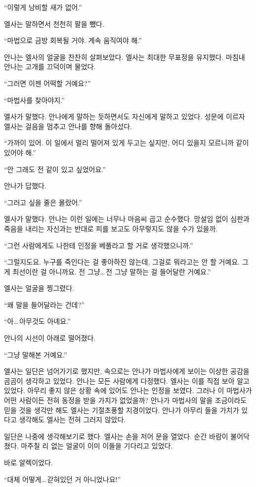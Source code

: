 ``이렇게 낭비할 새가 없어.''

엘사는 말하면서 천천히 팔을 뺐다.

``마법으로 금방 회복될 거야. 계속 움직여야 해.''

안나는 엘사의 얼굴을 찬찬히 살펴보았다. 엘사는 최대한 무표정을 유지했다. 마침내 안나는 고개를 끄덕이며 물었다.

``그러면 이젠 어떡할 거예요?''

``마법사를 찾아야지.''

엘사가 말했다. 안나에게 말하는 듯하면서도 자신에게 말하고 있었다. 성문에 이르자 엘사는 걸음을 멈추고 안나를 향해 돌아섰다.

``가까이 있어. 이 일에서 멀리 떨어져 있게 두고는 싶지만, 어디 있을지 모르니까 같이 있어야 해.''

``안 그래도 전 같이 있고 싶었어요.''

안나가 답했다.

``그러고 싶을 줄은 몰랐어.''

엘사가 말했다. 안나는 이런 일에는 너무나 마음씨 곱고 순수했다. 망설임 없이 심판과 죽음을 내리는 자신과는 반대로 피를 보고도 아무렇지도 않을 수가 있을까.

``그런 사람에게도 나한테 인정을 베풀라고 할 거로 생각했으니까.''

``그럴지도요. 누구를 죽인다는 걸 좋아하진 않는데, 그걸로 뭐라고는 안 할 거예요. 그게 최선이란 걸 아니까요. 전 그냥\ldots\,전 그냥 말하는 걸 들어달란 거예요.''

엘사는 얼굴을 찡그렸다.

``왜 말을 들어달라는 건데?''

``아\ldots\,아무것도 아녜요.''

안나의 시선이 아래로 떨어졌다.

``그냥 말해본 거예요.''

엘사는 일단은 넘어가기로 했지만, 속으로는 안나가 마법사에게 보이는 이상한 공감을 곰곰이 생각하고 있었다. 안나는 모든 사람에게 다정했다. 엘사는 이를 직접 보아 알고 있었다. 아무리 좋지 않은 상황 속에 있어도 안나는 인정을 보였다. 그러나 이 마법사가 어떤 사람이든 전혀 동정을 받을 가치가 없었을까? 안나가 마법사의 말을 조금이라도 믿을 것을 생각만 해도 엘사는 기절초풍할 지경이었다. 안나가 아무리 들을 가치가 있다고 생각해도 엘사는 전혀 그러지 않았다.

일단은 나중에 생각해보기로 했다. 엘사는 손을 저어 문을 열었다. 순간 바람이 불어닥쳤다. 마주칠 리 없는 얼굴이 이미 이들을 기다리고 있었다. 

바로 알렉이었다.

``대체 어떻게\ldots\,갇혀있던 거 아니었나요!''

